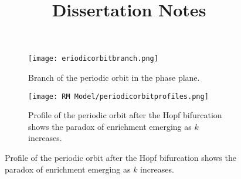 \documentclass[12pt]{article}
\title{Dissertation Notes}
\begin{document}
\begin{figure}[H]
    \begin{subfigure}[b]{0.5\linewidth}
        \centering
        \texttt{[image: eriodicorbitbranch.png]}
        \caption{Branch of the periodic orbit in the phase plane.}
        \hfill
    \end{subfigure}
    \begin{subfigure}[b]{0.5\linewidth}
        \centering
        \texttt{[image: RM Model/periodicorbitprofiles.png]}
        \caption{Profile of the periodic orbit after the Hopf bifurcation shows the paradox of enrichment emerging as $k$ increases.}
    \end{subfigure}
\end{figure}\label{fig: paradox of enrichment}
\end{document}
